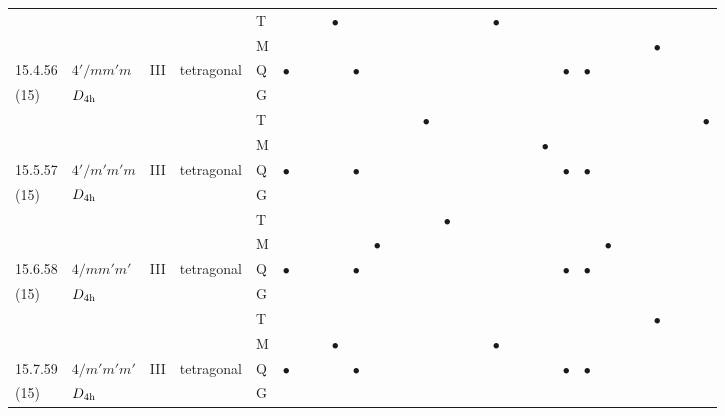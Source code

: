 \documentclass[fleqn,9pt,landscape]{jsarticle}
\begin{document}
\begin{longtable}{lllll|l|lll|ll|lll|l|lll|lll|l|ll|lll|lll}
 &  &  &  & T &  &  &  & $\bullet$ &  &  &  &  &  &  &  &  & $\bullet$ &  &  &  &  &  &  &  &  &  &  &  &  \\
 &  &  &  & M &  &  &  &  &  &  &  &  &  &  &  &  &  &  &  &  &  &  &  &  &  & $\bullet$ &  &  &  \\ \hline
15.4.56 & \texttt{$4'/mm'm$} & III & tetragonal & Q & $\bullet$ &  &  &  & $\bullet$ &  &  &  &  &  &  &  &  &  &  &  & $\bullet$ & $\bullet$ &  &  &  &  &  &  &  \\
(15) & $D_{\rm 4h}$ &  &  & G &  &  &  &  &  &  &  &  &  &  &  &  &  &  &  &  &  &  &  &  &  &  &  &  &  \\
 &  &  &  & T &  &  &  &  &  &  &  &  & $\bullet$ &  &  &  &  &  &  &  &  &  &  &  &  &  &  &  & $\bullet$ \\
 &  &  &  & M &  &  &  &  &  &  &  &  &  &  &  &  &  &  &  & $\bullet$ &  &  &  &  &  &  &  &  &  \\ \hline
15.5.57 & \texttt{$4'/m'm'm$} & III & tetragonal & Q & $\bullet$ &  &  &  & $\bullet$ &  &  &  &  &  &  &  &  &  &  &  & $\bullet$ & $\bullet$ &  &  &  &  &  &  &  \\
(15) & $D_{\rm 4h}$ &  &  & G &  &  &  &  &  &  &  &  &  &  &  &  &  &  &  &  &  &  &  &  &  &  &  &  &  \\
 &  &  &  & T &  &  &  &  &  &  &  &  &  & $\bullet$ &  &  &  &  &  &  &  &  &  &  &  &  &  &  &  \\
 &  &  &  & M &  &  &  &  &  & $\bullet$ &  &  &  &  &  &  &  &  &  &  &  &  & $\bullet$ &  &  &  &  &  &  \\ \hline
15.6.58 & \texttt{$4/mm'm'$} & III & tetragonal & Q & $\bullet$ &  &  &  & $\bullet$ &  &  &  &  &  &  &  &  &  &  &  & $\bullet$ & $\bullet$ &  &  &  &  &  &  &  \\
(15) & $D_{\rm 4h}$ &  &  & G &  &  &  &  &  &  &  &  &  &  &  &  &  &  &  &  &  &  &  &  &  &  &  &  &  \\
 &  &  &  & T &  &  &  &  &  &  &  &  &  &  &  &  &  &  &  &  &  &  &  &  &  & $\bullet$ &  &  &  \\
 &  &  &  & M &  &  &  & $\bullet$ &  &  &  &  &  &  &  &  & $\bullet$ &  &  &  &  &  &  &  &  &  &  &  &  \\ \hline
15.7.59 & \texttt{$4/m'm'm'$} & III & tetragonal & Q & $\bullet$ &  &  &  & $\bullet$ &  &  &  &  &  &  &  &  &  &  &  & $\bullet$ & $\bullet$ &  &  &  &  &  &  &  \\
(15) & $D_{\rm 4h}$ &  &  & G &  &  &  &  &  &  &  &  &  &  &  &  &  &  &  &  &  &  &  &  &  &  &  &  &  \\

\end{longtable}
\end{document}
